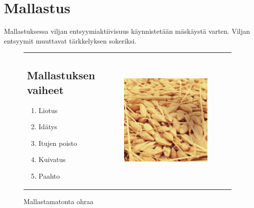 \documentclass[a4paper,11pt]{report}
\begin{document}
\section{Mallastus}

Mallastuksessa viljan entsyymiaktiivisuus käynnistetään mäskäystä varten. Viljan entsyymit muuttavat tärkkelyksen sokeriksi.

\begin{figure}
\begin{tabular}{p{}p{}}
\subsection{Mallastuksen vaiheet}
\vspace{1cm}
\begin{enumerate}
\item{Liotus}
\item{Idätys}
\item{Itujen poisto}
\item{Kuivatus}
\item{Paahto}
\end{enumerate}
&
\vspace{1cm}
\begin{minipage}{.5\textwidth}
    \centering
    \includegraphics[width=0.8\textwidth]{unmaltedbarley}
    \caption{Mallastamatonta ohraa}
    \end{minipage} \\
\end{tabular}
\end{figure}
\end{document}
